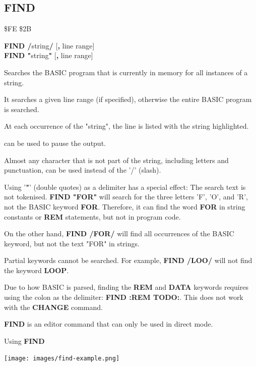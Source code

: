 \subsection{FIND}
\begin{description}[leftmargin=2cm,style=nextline]
\item [Token:]    \$FE \$2B

\item [Format:]   {\bf FIND /}string{\bf/} [{\bf,} line range] \\
		            {\bf FIND "}string{\bf"} [{\bf,} line range]

\item [Usage:]    Searches the BASIC program that is currently in memory for all instances of a string.

                  It searches a given line range (if specified), otherwise the entire BASIC program is searched.

                  At each occurrence of the "string", the line is listed with the string highlighted.

                   can be used to pause the output.

\item [Remarks:]  Almost any character that is not part of the string, including letters and punctuation, can be used instead of the '/' (slash).

                  Using '{\bf "}' (double quotes) as a delimiter has a special effect: The search text is not tokenised. {\bf FIND "FOR"} will search for the three letters 'F', 'O', and 'R', not the BASIC keyword {\bf FOR}. Therefore, it can find the word {\bf FOR} in string constants or {\bf REM} statements, but not in program code.

                  On the other hand, {\bf FIND /FOR/} will find all occurrences of the BASIC keyword, but not the text "FOR" in strings.

                  Partial keywords cannot be searched. For example, {\bf FIND /LOO/} will not find the keyword {\bf LOOP}.

                  Due to how BASIC is parsed, finding the {\bf REM} and {\bf DATA} keywords requires using the colon as the delimiter: {\bf FIND :REM TODO:}. This does not work with the {\bf CHANGE} command.

                  {\bf FIND} is an editor command that can only be used in direct mode.

\item [Example:]  Using {\bf FIND}

\item \begin{center}\texttt{[image: images/find-example.png]}\end{center}
\end{description}

